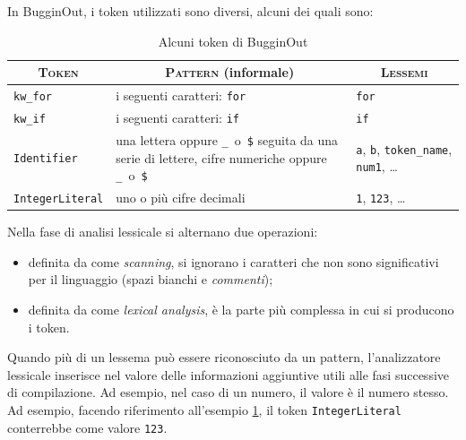 In BugginOut, i token utilizzati sono diversi, alcuni dei quali sono:
\begin{table}[H]
	\begin{tabularx}{\textwidth}{X|X|X}
		\hline
		\hline
		\multicolumn{1}{c|}{\textsc{Token}} & \multicolumn{1}{c|}{\textsc{Pattern} (informale)} & \multicolumn{1}{c}{\textsc{Lessemi}} \\
		\hline
		\texttt{kw\_for} & i seguenti caratteri: \texttt{for} & \texttt{for} \\
		\hline
		\texttt{kw\_if} & i seguenti caratteri: \texttt{if} & \texttt{if} \\
		\hline
		\texttt{Identifier} & una lettera oppure \mbox{\texttt{\_} o \texttt{\$}} seguita da una serie di lettere, cifre numeriche oppure \mbox{\texttt{\_} o \texttt{\$}} & \texttt{a}, \texttt{b}, \texttt{token\_name}, \texttt{num1}, \ldots \\
		\hline
		\texttt{IntegerLiteral} & uno o pi\`u cifre decimali\footnotemark & \texttt{1}, \texttt{123}, \ldots \\
		\hline
		\hline
	\end{tabularx}
	\caption{Alcuni token di BugginOut}
	\label{fig:bugginout-example-tokens}
\end{table}


Nella fase di analisi lessicale si alternano due operazioni:
\begin{itemize}
	\item definita da \cite{alfred2007compilers} come \emph{scanning}, si ignorano i caratteri che non sono significativi per il linguaggio (spazi bianchi e \emph{commenti});
	\item definita da \cite{alfred2007compilers} come \emph{lexical analysis}, \`e la parte pi\`u complessa in cui si producono i token.
\end{itemize}

Quando pi\`u di un lessema pu\`o essere riconosciuto da un pattern, l'analizzatore lessicale inserisce nel valore delle informazioni aggiuntive utili alle fasi successive di compilazione. Ad esempio, nel caso di un numero, il valore \`e il numero stesso. Ad esempio, facendo riferimento all'esempio \ref{fig:bugginout-example-tokens}, il token \texttt{IntegerLiteral} conterrebbe come valore \texttt{123}.

